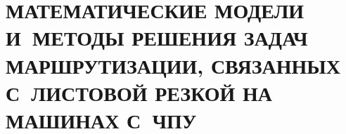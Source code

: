 

\part{\MakeUppercase{
  Математические модели и~методы решения задач маршрутизации,
  связанных с~листовой резкой на машинах с~ЧПУ
}}






